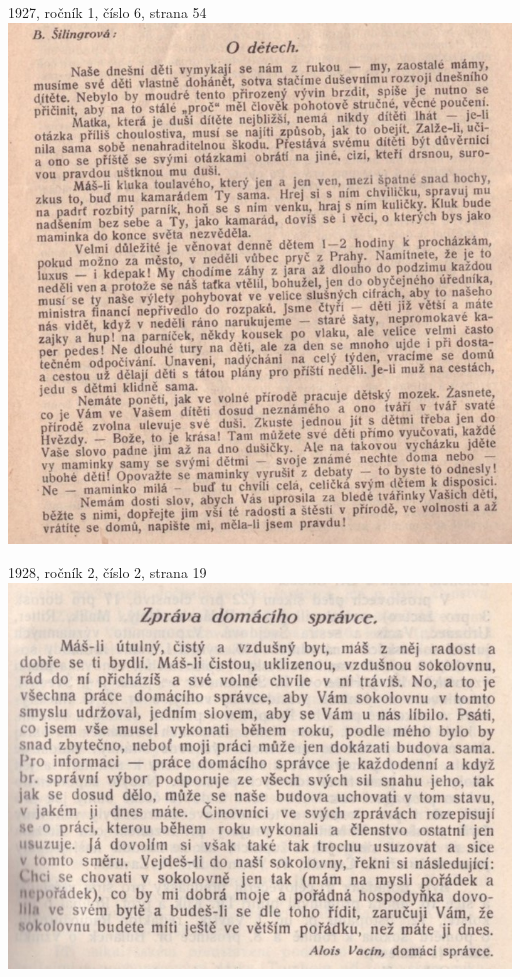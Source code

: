 \documentclass[11pt]{article}
\begin{document}
\vspace{\baselineskip}

1927, ročník 1, číslo 6, strana 54 \\
\includegraphics[width=\imagewidth]{original/1927/Skener_20250316 (6).jpg}




\clearpage

1928, ročník 2, číslo 2, strana 19 \\
\includegraphics[width=\imagewidth]{original/1928/Skener_20250320.jpg}
\end{document}
